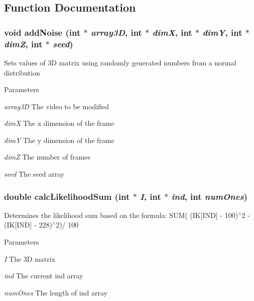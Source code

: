 \subsection{Function Documentation}
\hypertarget{ex__particle__CUDA__naive_8cu_ac771bf31b048f6a46077a3da36068a02}{
\subsubsection[{addNoise}]{\setlength{\rightskip}{0pt plus 5cm}void addNoise (int $\ast$ {\em array3D}, \/  int $\ast$ {\em dimX}, \/  int $\ast$ {\em dimY}, \/  int $\ast$ {\em dimZ}, \/  int $\ast$ {\em seed})}}
\label{ex__particle__CUDA__naive_8cu_ac771bf31b048f6a46077a3da36068a02}
Sets values of 3D matrix using randomly generated numbers from a normal distribution 
\begin{DoxyParams}{Parameters}
\item[{\em array3D}]The video to be modified \item[{\em dimX}]The x dimension of the frame \item[{\em dimY}]The y dimension of the frame \item[{\em dimZ}]The number of frames \item[{\em seed}]The seed array \end{DoxyParams}
\hypertarget{ex__particle__CUDA__naive_8cu_a875b89dec232da58dee8863b7d673808}{
\subsubsection[{calcLikelihoodSum}]{\setlength{\rightskip}{0pt plus 5cm}double calcLikelihoodSum (int $\ast$ {\em I}, \/  int $\ast$ {\em ind}, \/  int {\em numOnes})}}
\label{ex__particle__CUDA__naive_8cu_a875b89dec232da58dee8863b7d673808}
Determines the likelihood sum based on the formula: SUM( (IK\mbox{[}IND\mbox{]} -\/ 100)$^\wedge$2 -\/ (IK\mbox{[}IND\mbox{]} -\/ 228)$^\wedge$2)/ 100 
\begin{DoxyParams}{Parameters}
\item[{\em I}]The 3D matrix \item[{\em ind}]The current ind array \item[{\em numOnes}]The length of ind array \end{DoxyParams}
